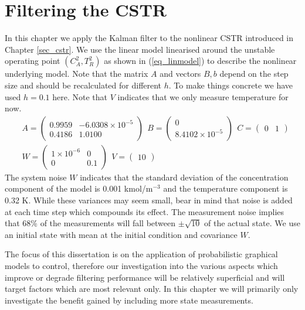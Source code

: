 \section{Filtering the CSTR}
\label{sec_filtering_linmods}
In this chapter we apply the Kalman filter to the nonlinear CSTR introduced in Chapter \ref{sec_cstr}. We use the linear model linearised around the unstable operating point $(C_A^2, T_R^2)$ as shown in (\ref{eq_linmodel}) to describe the nonlinear underlying model. Note that the matrix $A$ and vectors $B, b$ depend on the step size and should be recalculated for different $h$. To make things concrete we have used $h=0.1$ here. Note that $V$ indicates that we only measure temperature for now.
\begin{equation}
\begin{aligned}
&A = \begin{pmatrix}
0.9959 & -6.0308\times 10^{-5} \\
0.4186 & 1.0100
\end{pmatrix} ~~
B = \begin{pmatrix}
0 \\ 8.4102\times 10^{-5}
\end{pmatrix} ~~
C = \begin{pmatrix}
0 & 1
\end{pmatrix} \\
&W = \begin{pmatrix}
1\times 10^{-6} & 0 \\ 0 & 0.1
\end{pmatrix} ~~
V = \begin{pmatrix}
10
\end{pmatrix}
\end{aligned}
\label{eq_linmodel}
\end{equation}
The system noise $W$ indicates that the standard deviation of the concentration component of the model is 0.001 kmol/m$^{-3}$ and the temperature component is 0.32 K. While these variances may seem small, bear in mind that noise is added at each time step which compounds its effect. The measurement noise implies that 68\% of the measurements will fall between $\pm\sqrt{10}$ of the actual state. We use an initial state with mean at the initial condition and covariance $W$.

The focus of this dissertation is on the application of probabilistic graphical models to control, therefore our investigation into the various aspects which improve or degrade filtering performance will be relatively superficial and will target factors which are most relevant only. In this chapter we will primarily only investigate the benefit gained by including more state measurements.

